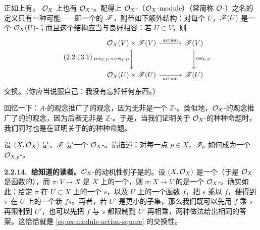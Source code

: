 正如\trRing{}上有\trModule，\trRing\trSheaf{} $\mathcal{O}_X$ 上也有 $\mathcal{O}_X$-\trModule。配得上 $\mathcal{O}_X$-\textbf{\trModule}（$\mathcal{O}_X$-module）（常简称 $\mathcal{O}$-\trModule）之名的定义只有一种可能——即一个\trAbelianGroups{}的\trSheaf{} $\mathscr{F}$，附带如下额外结构：对每个 $U$，$\mathscr{F}(U)$ 是一个 $\mathcal{O}_X(U)$-\trModule；而且这个结构应当与\trRestrictionMap{}良好相容：若 $U\subset V$，则
\begin{equation*}\tag{2.2.13.1}\label{eq:ox-module-action-square}
\begin{tikzcd}[row sep=2.8em, column sep=3.2em]
\OO_X(V)\times\scr{F}(V) \ar[r, "\mathrm{action}"] \ar[d, "\mathrm{res}_{V,U}\times\mathrm{res}_{V,U}"'] & \scr{F}(V) \ar[d, "\mathrm{res}_{V,U}"] \\
\OO_X(U)\times\scr{F}(U) \ar[r, "\mathrm{action}"'] & \scr{F}(U)
\end{tikzcd}
\end{equation*}
交换。（你应当说服自己：我没有忘掉任何东西。）

回忆一下：$A$-\trModule{}的观念推广了\trAbelianGroups{}的观念，因为\trAbelianGroups{}无非是一个 $\mathbb{Z}$-\trModule。类似地，$\mathcal{O}_X$-\trModule{}的观念推广了\trAbelianGroups{}的\trSheaf{}的观念，因为后者无非是 $\underline{\mathbb{Z}}$-\trModule。于是，当我们证明关于 $\mathcal{O}_X$-\trModule{}的种种命题时，我们同时也是在证明关于\trAbelianGroups{}的\trSheaf{}的种种命题。

\begin{exercise}\label{ex:stalk-of-ox-module}
设 $(X,\mathcal{O}_X)$ 是\trRingedSpace，$\mathscr{F}$ 是一个 $\mathcal{O}_X$-\trModule。请描述：对每一点 $p\in X$，$\mathscr{F}_p$ 如何成为一个 $\mathcal{O}_{X,p}$-\trModule。
\end{exercise}

\textbf{2.2.14.\ 给知道\trVectorBundle{}的读者。}\quad $\mathcal{O}_X$-\trModule{}的动机性例子是\trVectorBundle{}的\trSection\trSheaf。设 $(X,\mathcal{O}_X)$ 是一个\trDifferentiable\trManifold{}（于是 $\mathcal{O}_X$ 是\trSmooth{}函数的\trSheaf），而 $\pi\colon V\to X$ 是 $X$ 上的一个\trVectorBundle，则\trSmooth{}\trSection{} $\sigma\colon X\to V$ 的\trSheaf{}是一个 $\mathcal{O}_X$-\trModule。确实如此：给定 $\pi$ 在\trOpenSubset{} $U\subset X$ 上的一个\trSection{} $s$，以及 $U$ 上的一个函数 $f$，把 $s$ 乘以 $f$，便得到 $\pi$ 在 $U$ 上的一个新\trSection{} $fs$。再者，若 $U'$ 是更小的子集，那么我们既可以先用 $f$ 乘 $s$ 再限制到 $U'$，也可以先把 $f$ 与 $s$ 都限制到 $U'$ 再相乘，两种做法给出相同的答案。这恰恰就是 \eqref{eq:ox-module-action-square} 的交换性。
